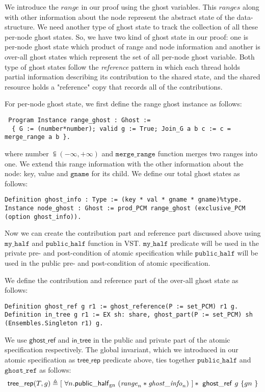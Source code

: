 \documentclass[acmsmall,screen]{acmart}\settopmatter{printfolios=true}
\begin{document}
We introduce the $range$ in our proof using the ghost variables. This $ranges$ along with other information about the node represent the abstract state of the data-structure. We need another type of ghost state to track the collection of all these per-node ghost states. So, we have two kind of ghost state in our proof: one is per-node ghost state which product of range and node information and another is over-all ghost states which represent the set of all per-node ghost variable. Both type of ghost states follow the \emph{reference} pattern in which each thread holds partial information describing its contribution to the shared state, and the shared resource holds a "reference" copy that records all of the contributions.

For per-node ghost state, we first define the range ghost instance as follows:
\begin{verbatim}
 Program Instance range_ghost : Ghost :=
  { G := (number*number); valid g := True; Join_G a b c := c =  merge_range a b }.
\end{verbatim}
where number $\subseteqq (-\infty,+\infty)$ and $\texttt{merge\_range}$ function merges two ranges into one. We extend this range information with the other information about the node: key, value and $\texttt{gname}$ for its child. We define our total ghost states as follows:
\begin{verbatim}
Definition ghost_info : Type := (key * val * gname * gname)%type.
Instance node_ghost : Ghost := prod_PCM range_ghost (exclusive_PCM (option ghost_info)).
\end{verbatim}

Now we can create the contribution part and reference part discussed above using $\texttt{my\_half}$ and $\texttt{public\_half}$ function in VST. $\texttt{my\_half}$ predicate will be used in the private pre- and post-condition of atomic specification while  $\texttt{public\_half}$ will be used in the public pre- and post-condition of atomic specification.

We define the contribution and reference part of the over-all ghost state as follows:
\begin{verbatim}
Definition ghost_ref g r1 := ghost_reference(P := set_PCM) r1 g.
Definition in_tree g r1 := EX sh: share, ghost_part(P := set_PCM) sh (Ensembles.Singleton r1) g.
\end{verbatim}
We use $\mathsf{ghost\_ref}$ and $\mathsf{in\_tree}$ in the public and private part of the atomic specification respectively. The global invariant, which we introduced in our atomic specification as $\mathsf{tree\_rep}$ predicate above, ties together $\texttt{public\_half}$ and $\texttt{ghost\_ref}$ as follows:
\begin{align*}\mathsf{tree\_rep}(T,g) \triangleq [\ \forall n. \mathsf{public\_half\textsubscript{gn}} \ (\mathit{range}_n* \mathit{ghost\_info}_n)\ ] *\ \mathsf{ghost\_ref}\ g\ \{ gn\  \} \end{align*}
\end{document}
